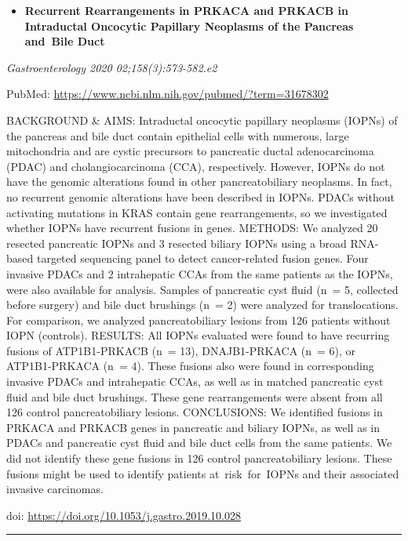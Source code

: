 \documentclass[
]{article}
\providecommand{\tightlist}{%
  \setlength{\itemsep}{0pt}\setlength{\parskip}{0pt}}
\begin{document}
\begin{itemize}
\tightlist
\item
  \textbf{Recurrent Rearrangements in PRKACA and PRKACB in Intraductal
  Oncocytic Papillary Neoplasms of the Pancreas and~Bile Duct}
\end{itemize}

\emph{Gastroenterology 2020 02;158(3):573-582.e2}

PubMed: \url{https://www.ncbi.nlm.nih.gov/pubmed/?term=31678302}

BACKGROUND \& AIMS: Intraductal oncocytic papillary neoplasms (IOPNs) of
the pancreas and bile duct contain epithelial cells with numerous, large
mitochondria and are cystic precursors to pancreatic ductal
adenocarcinoma (PDAC) and cholangiocarcinoma (CCA), respectively.
However, IOPNs do not have the genomic alterations found in other
pancreatobiliary neoplasms. In fact, no recurrent genomic alterations
have been described in IOPNs. PDACs without activating mutations in KRAS
contain gene rearrangements, so we investigated whether IOPNs have
recurrent fusions in genes. METHODS: We analyzed 20 resected pancreatic
IOPNs and 3 resected biliary IOPNs using a broad RNA-based targeted
sequencing panel to detect cancer-related fusion genes. Four invasive
PDACs and 2 intrahepatic CCAs from the same patients as the IOPNs, were
also available for analysis. Samples of pancreatic cyst fluid (n~= 5,
collected before surgery) and bile duct brushings (n~= 2) were analyzed
for translocations. For comparison, we analyzed pancreatobiliary lesions
from 126 patients without IOPN (controls). RESULTS: All IOPNs evaluated
were found to have recurring fusions of ATP1B1-PRKACB (n~= 13),
DNAJB1-PRKACA (n~= 6), or ATP1B1-PRKACA (n~= 4). These fusions also were
found in corresponding invasive PDACs and intrahepatic CCAs, as well as
in matched pancreatic cyst fluid and bile duct brushings. These gene
rearrangements were absent from all 126 control pancreatobiliary
lesions. CONCLUSIONS: We identified fusions in PRKACA and PRKACB genes
in pancreatic and biliary IOPNs, as well as in PDACs and pancreatic cyst
fluid and bile duct cells from the same patients. We did not identify
these gene fusions in 126 control pancreatobiliary lesions. These
fusions might be used to identify patients at~risk~for~IOPNs and their
associated invasive carcinomas.

doi: \url{https://doi.org/10.1053/j.gastro.2019.10.028}

\begin{center}\rule{0.5\linewidth}{0.5pt}\end{center}
\end{document}
